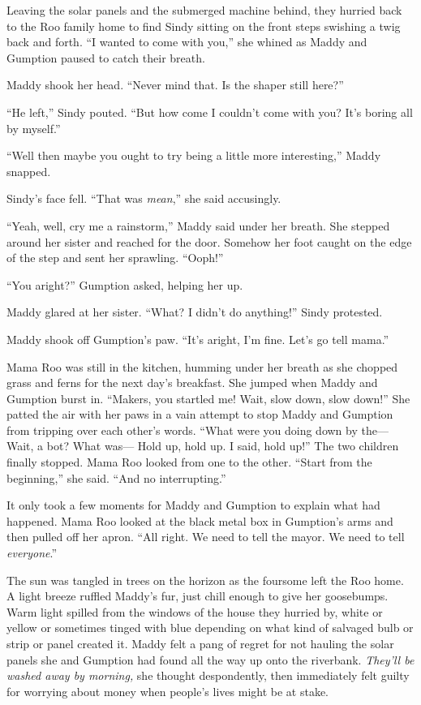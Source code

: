 \documentclass[10pt]{article}
\begin{document}
Leaving the solar panels and the submerged machine behind, they hurried
back to the Roo family home to find Sindy sitting on the front steps
swishing a twig back and forth. ``I wanted to come with you,'' she
whined as Maddy and Gumption paused to catch their breath.

Maddy shook her head. ``Never mind that. Is the shaper still here?''

``He left,'' Sindy pouted. ``But how come I couldn't come with you? It's
boring all by myself.''

``Well then maybe you ought to try being a little more interesting,''
Maddy snapped.

Sindy's face fell. ``That was \emph{mean},'' she said accusingly.

``Yeah, well, cry me a rainstorm,'' Maddy said under her breath. She
stepped around her sister and reached for the door. Somehow her foot
caught on the edge of the step and sent her sprawling. ``Ooph!''

``You aright?'' Gumption asked, helping her up.

Maddy glared at her sister. ``What? I didn't do anything!'' Sindy
protested.

Maddy shook off Gumption's paw. ``It's aright, I'm fine. Let's go tell
mama.''

Mama Roo was still in the kitchen, humming under her breath as she
chopped grass and ferns for the next day's breakfast. She jumped when
Maddy and Gumption burst in. ``Makers, you startled me! Wait, slow down,
slow down!'' She patted the air with her paws in a vain attempt to stop
Maddy and Gumption from tripping over each other's words. ``What were
you doing down by the--- Wait, a bot? What was--- Hold up, hold up. I
said, hold up!'' The two children finally stopped. Mama Roo looked from
one to the other. ``Start from the beginning,'' she said. ``And no
interrupting.''

It only took a few moments for Maddy and Gumption to explain what had
happened. Mama Roo looked at the black metal box in Gumption's arms and
then pulled off her apron. ``All right. We need to tell the mayor. We
need to tell \emph{everyone}.''

The sun was tangled in trees on the horizon as the foursome left the Roo
home. A light breeze ruffled Maddy's fur, just chill enough to give her
goosebumps. Warm light spilled from the windows of the house they
hurried by, white or yellow or sometimes tinged with blue depending on
what kind of salvaged bulb or strip or panel created it. Maddy felt a
pang of regret for not hauling the solar panels she and Gumption had
found all the way up onto the riverbank. \emph{They'll be washed away by
morning,} she thought despondently, then immediately felt guilty for
worrying about money when people's lives might be at stake.
\end{document}
